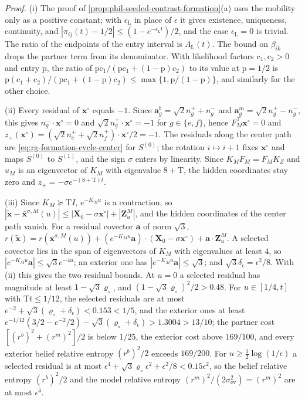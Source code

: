 \noindent\emph{Proof.}
(i) The proof of \cref{prop:phil-seeded-contrast-formation}(a) uses the
mobility only as a positive constant; with \(\epsilon_{\mathrm L}\) in place
of \(\epsilon\) it gives existence, uniqueness, continuity, and
\(|\pi_{ij}(t)-1/2|\le(1-e^{-\epsilon_{\mathrm L}t})/2\), and the case
\(\epsilon_{\mathrm L}=0\) is trivial. The ratio of the endpoints of the
entry interval is \(\Lambda_{\mathrm L}(t)\). The bound on \(\beta_{ik}\)
drops the partner term from its denominator. With likelihood factors
\(\mathrm c_1,\mathrm c_2>0\) and entry \(\mathrm p\), the ratio of
\(\mathrm p\mathrm c_1/(\mathrm p\mathrm c_1+(1-\mathrm p)\mathrm c_2)\) to
its value at \(\mathrm p=1/2\) is
\(\mathrm p(\mathrm c_1+\mathrm c_2)/(\mathrm p\mathrm c_1+(1-\mathrm p)\mathrm c_2)
\le\max\{1,\mathrm p/(1-\mathrm p)\}\), and similarly for the other choice.

(ii) Every residual of \(\mathbf x^\circ\) equals \(-1\). Since
\(\mathbf a^b_g=\sqrt2n^+_g+n^-_g\) and \(\mathbf a^m_g=\sqrt2n^+_g-n^-_g\),
this gives \(n^-_g\cdot\mathbf x^\circ=0\) and
\(\sqrt2n^+_g\cdot\mathbf x^\circ=-1\) for \(g\in\{e,f\}\), hence
\(F_M^\top\mathbf x^\circ=0\) and
\(z_+(\mathbf x^\circ)=(\sqrt2n^+_e+\sqrt2n^+_f)\cdot\mathbf x^\circ/2=-1\).
The residuals along the center path are
\cref{eq:rg-formation-cycle-center} for \(S^{(0)}\); the rotation
\(i\mapsto i+1\) fixes \(\mathbf x^\circ\) and maps \(S^{(0)}\) to
\(S^{(1)}\), and the sign \(\sigma\) enters by linearity. Since
\(K_MF_M=F_MK_Z\) and \(u_M\) is an eigenvector of \(K_M\) with eigenvalue
\(8+\mathrm T\), the hidden coordinates stay zero and
\(z_+=-\sigma e^{-(8+\mathrm T)t}\).

(iii) Since \(K_M\succeq\mathrm TI\), \(e^{-K_Mu}\) is a contraction, so
\(|\widetilde{\mathbf x}-\bar{\mathbf x}^{\sigma,M}(u)|
\le|\mathbf X_0-\sigma\mathbf x^\circ|+|\mathbf Z^M_u|\), and the hidden
coordinates of the center path vanish. For a residual covector \(\mathbf a\)
of norm \(\sqrt3\),
\(r(\widetilde{\mathbf x})=r(\bar{\mathbf x}^{\sigma,M}(u))
+(e^{-K_Mu}\mathbf a)\cdot(\mathbf X_0-\sigma\mathbf x^\circ)
+\mathbf a\cdot\mathbf Z^M_u\). A selected covector lies in the span of
eigenvectors of \(K_M\) with eigenvalues at least \(4\), so
\(|e^{-K_Mu}\mathbf a|\le\sqrt3e^{-4u}\); an exterior one has
\(|e^{-K_Mu}\mathbf a|\le\sqrt3\); and \(\sqrt3\delta_\epsilon=\epsilon^2/8\).
With (ii) this gives the two residual bounds. At \(u=0\) a selected residual
has magnitude at least \(1-\sqrt3\varrho_\circ\), and
\((1-\sqrt3\varrho_\circ)^2/2>0.48\). For \(u\in[1/4,t]\) with
\(\mathrm Tt\le1/12\), the selected residuals are at most
\(e^{-2}+\sqrt3(\varrho_\circ+\delta_\epsilon)<0.153<1/5\), and the exterior
ones at least
\(e^{-1/12}(3/2-e^{-2}/2)-\sqrt3(\varrho_\circ+\delta_\epsilon)>1.3004>13/10\);
the partner cost \([(r^b)^2+(r^m)^2]/2\) is below \(1/25\), the exterior cost
above \(169/100\), and every exterior belief relative entropy
\((r^b)^2/2\) exceeds \(169/200\). For \(u\ge\frac12\log(1/\epsilon)\) a
selected residual is at most
\(\epsilon^4+\sqrt3\varrho_\circ\epsilon^2+\epsilon^2/8<0.15\epsilon^2\),
so the belief relative entropy \((r^b)^2/2\) and the model relative entropy
\((r^m)^2/(2\sigma^2_{\mathrm{ev}})=(r^m)^2\) are at most \(\epsilon^4\).

